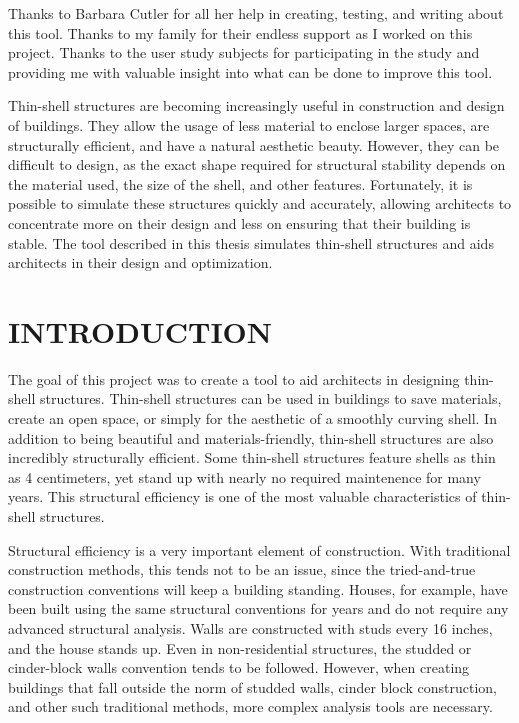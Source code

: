 \documentclass{thesis}
\author{R. Allan Pendergrast}
\begin{document}
 
\titlepage             %
\tableofcontents       %
\listoftables          %
\listoffigures         %

Thanks to Barbara Cutler for all her help in creating, testing, and writing about this tool.  Thanks to my family for their endless
support as I worked on this project.  Thanks to the user study subjects for participating in the study and providing me with valuable
insight into what can be done to improve this tool.

Thin-shell structures are becoming increasingly useful in construction and design of buildings.  They allow the usage of less material to enclose
larger spaces, are structurally efficient, and have a natural aesthetic beauty.  However, they can be difficult to design, as the exact shape
required for structural stability depends on the material used, the size of the shell, and other features.  Fortunately, it is possible to simulate
these structures quickly and accurately, allowing architects to concentrate more on their design and less on ensuring that their building is
stable.  The tool described in this thesis simulates thin-shell structures and aids architects in their design and optimization.

\chapter{INTRODUCTION} \label{chp:introduction}

The goal of this project was to create a tool to aid architects in designing thin-shell structures.  Thin-shell structures can be used in
buildings to save materials, create an open space, or simply for the aesthetic of a smoothly curving shell.  In addition to being beautiful
and materials-friendly, thin-shell structures are also incredibly structurally efficient.  Some thin-shell structures feature shells as thin
as 4 centimeters, yet stand up with nearly no required maintenence for many years.  This structural efficiency is one of the most valuable
characteristics of thin-shell structures.

Structural efficiency is a very important element of construction.  With traditional construction methods, this tends not to be an issue, since
the tried-and-true construction conventions will keep a building standing.  Houses, for example, have been built using the same structural
conventions for years and do not require any advanced structural analysis.  Walls are constructed with studs every 16 inches, and the house
stands up.  Even in non-residential structures, the studded or cinder-block walls convention tends to be followed.  However, when creating
buildings that fall outside the norm of studded walls, cinder block construction, and other such traditional methods, more complex analysis
tools are necessary.
\end{document}
